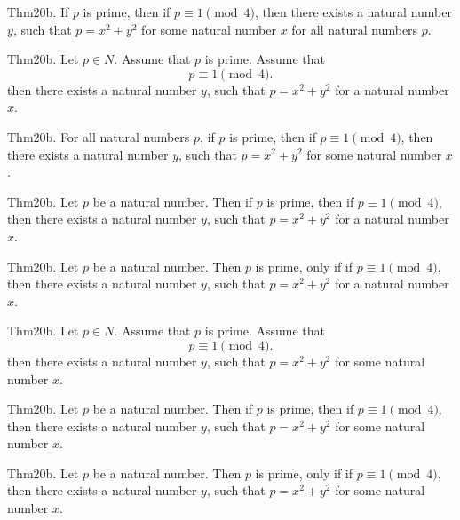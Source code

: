 \documentclass{article}
\begin{document}
Thm20b. If $p$ is prime, then if $p \equiv 1 \pmod{ 4}$, then there exists a natural number $y$, such that $p = x ^{ 2}+ y ^{ 2}$ for some natural number $x$ for all natural numbers $p$.

Thm20b. Let $p \in N$. Assume that $p$ is prime. Assume that $$p \equiv 1 \pmod{ 4}.$$ then there exists a natural number $y$, such that $p = x ^{ 2}+ y ^{ 2}$ for a natural number $x$.

Thm20b. For all natural numbers $p$, if $p$ is prime, then if $p \equiv 1 \pmod{ 4}$, then there exists a natural number $y$, such that $p = x ^{ 2}+ y ^{ 2}$ for some natural number $x$.

Thm20b. Let $p$ be a natural number. Then if $p$ is prime, then if $p \equiv 1 \pmod{ 4}$, then there exists a natural number $y$, such that $p = x ^{ 2}+ y ^{ 2}$ for a natural number $x$.

Thm20b. Let $p$ be a natural number. Then $p$ is prime, only if if $p \equiv 1 \pmod{ 4}$, then there exists a natural number $y$, such that $p = x ^{ 2}+ y ^{ 2}$ for a natural number $x$.

Thm20b. Let $p \in N$. Assume that $p$ is prime. Assume that $$p \equiv 1 \pmod{ 4}.$$ then there exists a natural number $y$, such that $p = x ^{ 2}+ y ^{ 2}$ for some natural number $x$.

Thm20b. Let $p$ be a natural number. Then if $p$ is prime, then if $p \equiv 1 \pmod{ 4}$, then there exists a natural number $y$, such that $p = x ^{ 2}+ y ^{ 2}$ for some natural number $x$.

Thm20b. Let $p$ be a natural number. Then $p$ is prime, only if if $p \equiv 1 \pmod{ 4}$, then there exists a natural number $y$, such that $p = x ^{ 2}+ y ^{ 2}$ for some natural number $x$.
\end{document}
